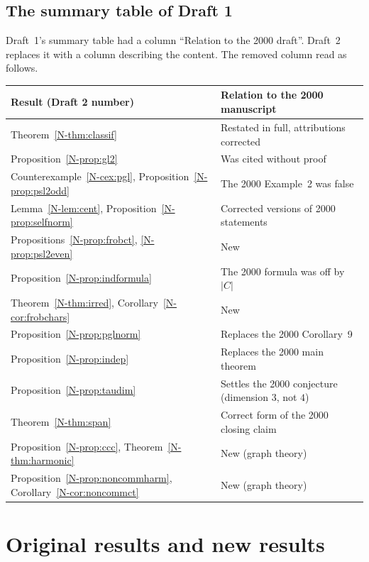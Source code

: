 \documentclass[12pt,letterpaper]{article}
\begin{document}
\subsection{The summary table of Draft 1}
Draft~1's summary table had a column ``Relation to the 2000 draft''. Draft~2
replaces it with a column describing the content. The removed column read as
follows.

\begin{center}
\renewcommand{\arraystretch}{1.1}
\begin{tabular}{>{\raggedright}p{5.4cm}>{\raggedright\arraybackslash}p{8.6cm}}
\toprule
Result (Draft 2 number) & Relation to the 2000 manuscript\\
\midrule
Theorem~\ref{N-thm:classif} & Restated in full, attributions corrected\\
Proposition~\ref{N-prop:gl2} & Was cited without proof\\
Counterexample~\ref{N-cex:pgl}, Proposition~\ref{N-prop:psl2odd} & The 2000
Example~2 was false\\
Lemma~\ref{N-lem:cent}, Proposition~\ref{N-prop:selfnorm} & Corrected
versions of 2000 statements\\
Propositions~\ref{N-prop:frobct}, \ref{N-prop:psl2even} & New\\
Proposition~\ref{N-prop:indformula} & The 2000 formula was off by $|C|$\\
Theorem~\ref{N-thm:irred}, Corollary~\ref{N-cor:frobchars} & New\\
Proposition~\ref{N-prop:pglnorm} & Replaces the 2000 Corollary~9\\
Proposition~\ref{N-prop:indep} & Replaces the 2000 main theorem\\
Proposition~\ref{N-prop:taudim} & Settles the 2000 conjecture (dimension
$3$, not $4$)\\
Theorem~\ref{N-thm:span} & Correct form of the 2000 closing claim\\
Proposition~\ref{N-prop:ccc}, Theorem~\ref{N-thm:harmonic} & New (graph
theory)\\
Proposition~\ref{N-prop:noncommharm}, Corollary~\ref{N-cor:noncommct} & New
(graph theory)\\
\bottomrule
\end{tabular}
\end{center}

\section{Original results and new results}\label{sec:split}
\end{document}
